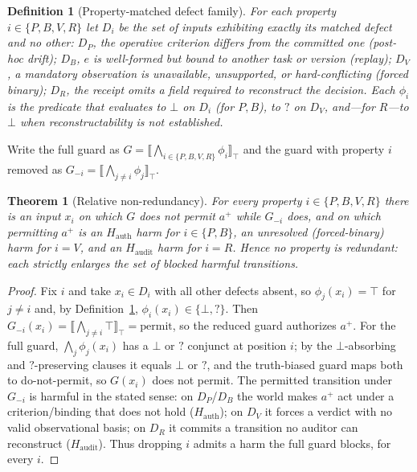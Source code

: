 \documentclass[sigconf,anonymous,review]{acmart}
\newtheorem{theorem}{Theorem}
\newtheorem{definition}{Definition}
\begin{document}
\begin{definition}[Property-matched defect family]
\label{def:defects}
For each property $i\in\{P,B,V,R\}$ let $D_i$ be the set of inputs exhibiting exactly its matched defect and no other: $D_P$, the operative criterion differs from the committed one (post-hoc drift); $D_B$, $e$ is well-formed but bound to another task or version (replay); $D_V$, a mandatory observation is unavailable, unsupported, or hard-conflicting (forced binary); $D_R$, the receipt omits a field required to reconstruct the decision. Each $\phi_i$ is the predicate that evaluates to $\bot$ on $D_i$ (for $P,B$), to $?$ on $D_V$, and---for $R$---to $\bot$ when reconstructability is not established.
\end{definition}

Write the full guard as $G=\llbracket\bigwedge_{i\in\{P,B,V,R\}}\phi_i\rrbracket_\top$ and the guard with property $i$ removed as $G_{-i}=\llbracket\bigwedge_{j\neq i}\phi_j\rrbracket_\top$.

\begin{theorem}[Relative non-redundancy]
\label{thm:necessity}
For every property $i\in\{P,B,V,R\}$ there is an input $x_i$ on which $G$ does not permit $a^+$ while $G_{-i}$ does, and on which permitting $a^+$ is an $H_{\mathrm{auth}}$ harm for $i\in\{P,B\}$, an unresolved (forced-binary) harm for $i=V$, and an $H_{\mathrm{audit}}$ harm for $i=R$. Hence no property is redundant: each strictly enlarges the set of blocked harmful transitions.
\end{theorem}
\begin{proof}
Fix $i$ and take $x_i\in D_i$ with all other defects absent, so $\phi_j(x_i)=\top$ for $j\neq i$ and, by Definition~\ref{def:defects}, $\phi_i(x_i)\in\{\bot,?\}$. Then $G_{-i}(x_i)=\llbracket\bigwedge_{j\neq i}\top\rrbracket_\top=\text{permit}$, so the reduced guard authorizes $a^+$. For the full guard, $\bigwedge_j\phi_j(x_i)$ has a $\bot$ or $?$ conjunct at position $i$; by the $\bot$-absorbing and $?$-preserving clauses it equals $\bot$ or $?$, and the truth-biased guard maps both to do-not-permit, so $G(x_i)$ does not permit. The permitted transition under $G_{-i}$ is harmful in the stated sense: on $D_P$/$D_B$ the world makes $a^+$ act under a criterion/binding that does not hold ($H_{\mathrm{auth}}$); on $D_V$ it forces a verdict with no valid observational basis; on $D_R$ it commits a transition no auditor can reconstruct ($H_{\mathrm{audit}}$). Thus dropping $i$ admits a harm the full guard blocks, for every $i$.
\end{proof}
\end{document}
